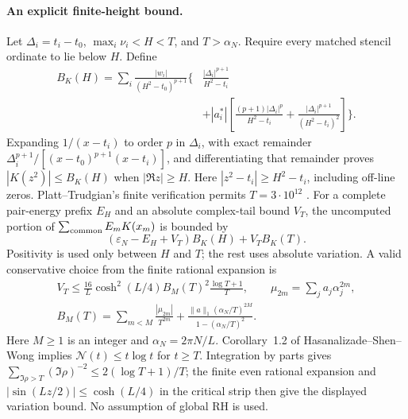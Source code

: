 \paragraph{An explicit finite-height bound.}
Let $\Delta_i=t_i-t_0$, $\max_i\nu_i<H<T$, and $T>\alpha_N$. Require every matched stencil ordinate to lie below $H$. Define
\begin{align*}
 B_K(H)=\sum_i\frac{|w_i|}{(H^2-t_0)^{p+1}}
 \biggl\{&\frac{|\Delta_i|^{p+1}}{H^2-t_i}\\
 &+|a_i^*|\left[\frac{(p+1)|\Delta_i|^p}{H^2-t_i}
             +\frac{|\Delta_i|^{p+1}}{(H^2-t_i)^2}\right]\biggr\}.
\end{align*}
Expanding $1/(x-t_i)$ to order $p$ in $\Delta_i$, with exact remainder
$\Delta_i^{p+1}/[(x-t_0)^{p+1}(x-t_i)]$, and differentiating that remainder
proves $|K(z^2)|\le B_K(H)$ when $|\Re z|\ge H$.
Here $|z^2-t_i|\ge H^2-t_i$, including off-line zeros.
Platt--Trudgian's finite verification permits $T=3\cdot10^{12}$
\cite{AttackPlattTrudgian}. For a complete pair-energy prefix $E_H$ and an
absolute complex-tail bound $V_T$, the uncomputed portion of
$\sum_{\rm common}E_mK(x_m)$ is bounded by
\begin{equation}\label{eq:multiroot-tail}
 (\varepsilon_N-E_H+V_T)B_K(H)+V_TB_K(T).
\end{equation}
Positivity is used only between $H$ and $T$; the rest uses absolute variation.
A valid conservative choice from the finite rational expansion is
\begin{gather*}
 V_T\le\frac{16}{L}\cosh^2(L/4)B_M(T)^2\frac{\log T+1}{T},
 \qquad \mu_{2m}=\sum_j a_j\alpha_j^{2m},\\
 B_M(T)=\sum_{m<M}\frac{|\mu_{2m}|}{T^{2m}}+
 \frac{\|a\|_1(\alpha_N/T)^{2M}}{1-(\alpha_N/T)^2}.
\end{gather*}
Here $M\ge1$ is an integer and $\alpha_N=2\pi N/L$.
Corollary~1.2 of Hasanalizade--Shen--Wong \cite{AttackZeroCount}
implies $\mathcal N(t)\le t\log t$ for $t\ge T$. Integration by parts gives
$\sum_{\Im\rho>T}(\Im\rho)^{-2}\le2(\log T+1)/T$; the finite even
rational expansion and $|\sin(Lz/2)|\le\cosh(L/4)$ in the critical strip
then give the displayed variation bound. No assumption of global RH is used.

